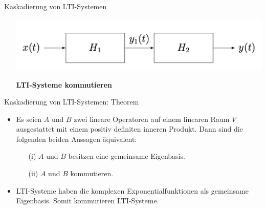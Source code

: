 \documentclass[14pt, aspectratio=169, handout]{beamer}
\begin{document}
\begin{frame}{Kaskadierung von LTI-Systemen}
    \begin{itemize}
        \item[] \begin{center}
            \includegraphics[width=\linewidth]{figures/Kaskadierung.png}
        \end{center}
        \item[] 
        \item[] \begin{center}
            \textbf{LTI-Systeme kommutieren}
        \end{center}
    \end{itemize}
\end{frame}

\begin{frame}{Kaskadierung von LTI-Systemen: Theorem}
    \begin{itemize}
        \item Es seien $A$ und $B$ zwei lineare Operatoren auf einem linearen Raum $V$ ausgestattet mit einem positiv definiten inneren Produkt. Dann sind die folgenden beiden Aussagen äquivalent: \begin{itemize}
        \item[] 
        \item[(i)] $A$ und $B$ besitzen eine gemeinsame Eigenbasis.
        \item[] 
        \item[(ii)] $A$ und $B$ kommutieren.
    \end{itemize}
    \item[] 
    \item LTI-Systeme haben die komplexen Exponentialfunktionen als gemeinsame Eigenbasis. Somit kommutieren LTI-Systeme.
    \end{itemize}
\end{frame}
\end{document}
